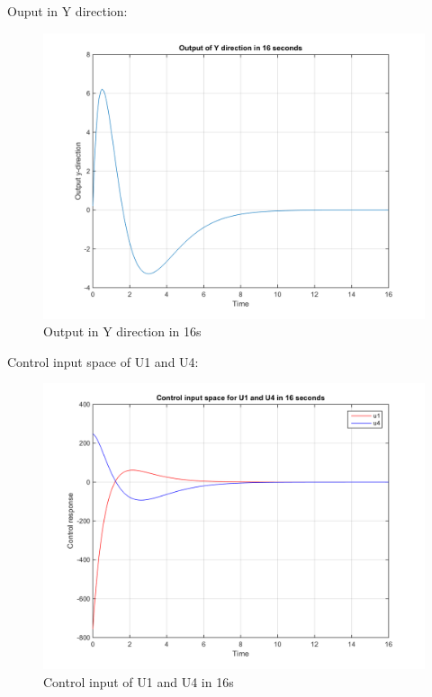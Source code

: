 \documentclass[14pt,a4paper]{article}
\begin{document}
	Ouput in Y direction:
	\begin{figure}[htp]
		\begin{center}
			\includegraphics[scale=0.8]{OutputYdirection16s.png}
			\caption{Output in Y direction in 16s}
		\end{center}
	\end{figure}
	\pagebreak
	
	Control input space of U1 and U4:
	\begin{figure}[htp]
		\begin{center}
			\includegraphics[scale=0.8]{ControlInputU1U4_16s.png}
			\caption{Control input of U1 and U4 in 16s}
		\end{center}
	\end{figure}
	
\end{document}
